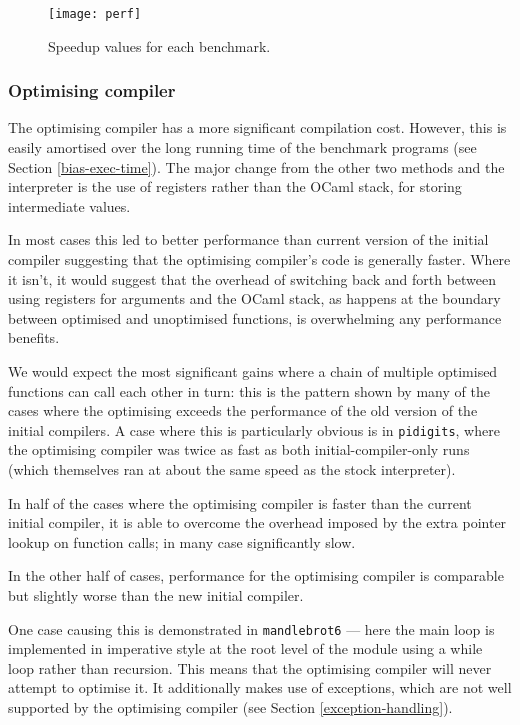 \begin{landscape}
      \begin{figure}[h]
            \texttt{[image: perf]}
            \caption{Speedup values for each benchmark.}
            \label{fig:perf}
      \end{figure}
\end{landscape}

\subsubsection{Optimising compiler}

The optimising compiler has a more significant compilation cost. However, this is easily amortised
over the long running time of the benchmark programs (see Section \ref{bias-exec-time}). The major
change
from the other two methods and the interpreter is the use of registers rather than the OCaml stack,
for storing intermediate values.

In most cases this led to better performance than current version of the initial compiler
suggesting
that the optimising compiler's code is generally faster. Where it isn't, it would suggest that the
overhead of switching back and forth between using registers for arguments and the OCaml stack, as
happens at the boundary between optimised and unoptimised functions, is overwhelming any
performance
benefits.

We would expect the most significant gains where a chain of multiple optimised functions can call
each other in turn: this is the pattern shown by many of the cases where the optimising exceeds the
performance of the old version of the initial compilers. A case where this is particularly obvious
is in \texttt{pidigits}, where the optimising compiler was twice as fast as both
initial-compiler-only runs (which themselves ran at about the same speed as the stock interpreter).

In half of the cases where the optimising compiler is faster than the current initial
compiler, it is able to overcome the overhead imposed by the extra pointer lookup on function
calls; in many
case significantly slow.

In the other half of cases, performance for the optimising compiler is comparable but slightly
worse
than the new initial compiler.

One case causing this is demonstrated in \texttt{mandlebrot6} --- here the main loop is implemented
in
imperative style at the root level of the module using a while loop rather than recursion. This
means that the optimising compiler will never attempt to optimise it. It additionally makes use of
exceptions, which are not well supported by the optimising compiler (see Section
\ref{exception-handling}).


